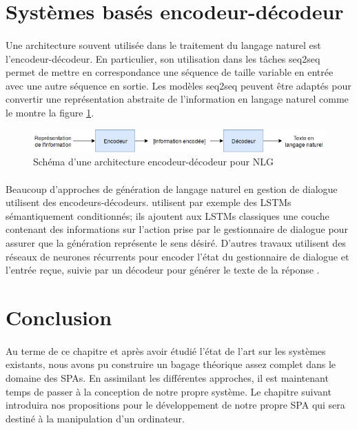 \section{Systèmes basés encodeur-décodeur}
\paragraph{}
Une architecture souvent utilisée dans le traitement du langage naturel est l'encodeur-décodeur. En particulier, son utilisation dans les tâches seq2seq permet de mettre en correspondance une séquence de taille variable en entrée avec une autre séquence en sortie. Les modèles seq2seq peuvent être adaptés pour convertir une représentation abstraite de l'information en langage naturel \citep {Ferreira2017} comme le montre la figure \ref{EncoderNLG}.\newline
\begin{figure}[H]
	\centering
	\includegraphics[width=.95\linewidth]{images/NLG/Encoder.png} 
	\caption{Schéma d'une architecture encodeur-décodeur pour NLG}\label{EncoderNLG}
\end{figure}
\paragraph{}
Beaucoup d'approches de génération de langage naturel en gestion de dialogue utilisent des encodeurs-décodeurs. \cite{Wen2015} utilisent par exemple des LSTMs sémantiquement conditionnés; ils ajoutent aux LSTMs classiques une couche contenant des informations sur l'action prise par le gestionnaire de dialogue pour assurer que la génération représente le sens désiré. D'autres travaux utilisent des réseaux de neurones récurrents pour encoder l'état du gestionnaire de dialogue et l'entrée reçue, suivie par un décodeur pour générer le texte de la réponse \citep{Sordoni2015,Serban2016,Goyal2016}.
\section{Conclusion}
\paragraph{}
Au terme de ce chapitre et après avoir étudié l'état de l'art sur les systèmes existants, nous avons pu construire un bagage théorique assez complet dans le domaine des SPAs. En assimilant les différentes approches, il est maintenant temps de passer à la conception de notre propre système. Le chapitre suivant introduira nos propositions pour le développement de notre propre SPA qui sera destiné à la manipulation d'un ordinateur.